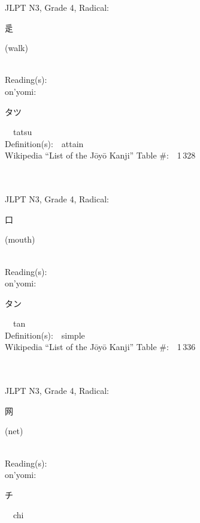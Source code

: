 \begin{multicols}{2}
{JLPT N3, Grade 4, Radical:\ \ {\begin{CJK}{UTF8}{min} 辵 \end{CJK}} (walk) } \\
Reading(s):\ \ \\
{\hspace*{1em}}on'yomi:\ \ \\
{\hspace*{2em}}{\begin{CJK}{UTF8}{min} タツ \end{CJK}}\ \ tatsu\ \ \\
Definition(s):\ \ attain \\
Wikipedia ``List of the J\=oy\=o Kanji'' Table \#:\ \ 1\,328 \\
\ \ \\
{\fontsize{34pt}{40pt}  }\ \ \\  %
{JLPT N3, Grade 4, Radical:\ \ {\begin{CJK}{UTF8}{min} 口 \end{CJK}} (mouth) } \\
Reading(s):\ \ \\
{\hspace*{1em}}on'yomi:\ \ \\
{\hspace*{2em}}{\begin{CJK}{UTF8}{min} タン \end{CJK}}\ \ tan\ \ \\
Definition(s):\ \ simple \\
Wikipedia ``List of the J\=oy\=o Kanji'' Table \#:\ \ 1\,336 \\
\ \ \\
{\fontsize{34pt}{40pt}  }\ \ \\  %
{JLPT N3, Grade 4, Radical:\ \ {\begin{CJK}{UTF8}{min} 网 \end{CJK}} (net) } \\
Reading(s):\ \ \\
{\hspace*{1em}}on'yomi:\ \ \\
{\hspace*{2em}}{\begin{CJK}{UTF8}{min} チ \end{CJK}}\ \ chi\ \ \\

\end{multicols}
